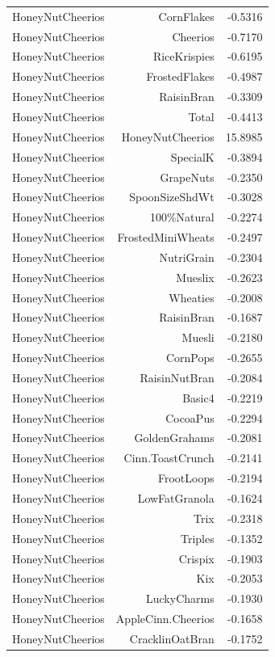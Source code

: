 \begin{longtable}{@{}lrr@{}}
HoneyNutCheerios & CornFlakes & -0.5316 \\
HoneyNutCheerios & Cheerios & -0.7170 \\
HoneyNutCheerios & RiceKrispies & -0.6195 \\
HoneyNutCheerios & FrostedFlakes & -0.4987 \\
HoneyNutCheerios & RaisinBran & -0.3309 \\
HoneyNutCheerios & Total & -0.4413 \\
HoneyNutCheerios & HoneyNutCheerios & 15.8985 \\
HoneyNutCheerios & SpecialK & -0.3894 \\
HoneyNutCheerios & GrapeNuts & -0.2350 \\
HoneyNutCheerios & SpoonSizeShdWt & -0.3028 \\
HoneyNutCheerios & 100\%Natural & -0.2274 \\
HoneyNutCheerios & FrostedMiniWheats & -0.2497 \\
HoneyNutCheerios & NutriGrain & -0.2304 \\
HoneyNutCheerios & Mueslix & -0.2623 \\
HoneyNutCheerios & Wheaties & -0.2008 \\
HoneyNutCheerios & RaisinBran & -0.1687 \\
HoneyNutCheerios & Muesli & -0.2180 \\
HoneyNutCheerios & CornPops & -0.2655 \\
HoneyNutCheerios & RaisinNutBran & -0.2084 \\
HoneyNutCheerios & Basic4 & -0.2219 \\
HoneyNutCheerios & CocoaPus & -0.2294 \\
HoneyNutCheerios & GoldenGrahams & -0.2081 \\
HoneyNutCheerios & Cinn.ToastCrunch & -0.2141 \\
HoneyNutCheerios & FrootLoops & -0.2194 \\
HoneyNutCheerios & LowFatGranola & -0.1624 \\
HoneyNutCheerios & Trix & -0.2318 \\
HoneyNutCheerios & Triples & -0.1352 \\
HoneyNutCheerios & Crispix & -0.1903 \\
HoneyNutCheerios & Kix & -0.2053 \\
HoneyNutCheerios & LuckyCharms & -0.1930 \\
HoneyNutCheerios & AppleCinn.Cheerios & -0.1658 \\
HoneyNutCheerios & CracklinOatBran & -0.1752 \\

\end{longtable}
